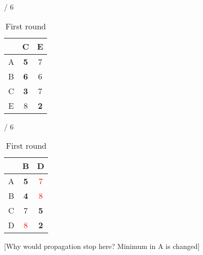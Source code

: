 \documentclass[a4paper, 11 pt, article, accentcolor=tud7b]{tudreport}
\begin{document}
\begin{table}[h]
\begin{subtable}[b]{\textwidth / 6}
\begin{tabular}{| c | c | c |}
	    \hline
	      & C                  & E                  \\ \hline
	    A & \textbf{5}         & 7                  \\ \hline
	    B & \textbf{6}         & 6                  \\ \hline
	    C & \textbf{3}         & 7                  \\ \hline
	    E & 8                  & \textbf{2}         \\ \hline
	    \end{tabular}
	    \caption{$D^{D}$}
	  \end{subtable}
	  \hfill
	  \begin{subtable}[b]{\textwidth / 6}
	    \begin{tabular}{| c | c | c |}
	    \hline
	      & B                   & D                    \\ \hline
	    A & \textbf{5}          & \textcolor{red}{7}   \\ \hline
	    B & \textbf{4}          & \textcolor{red}{8}   \\ \hline
	    C & 7                   & \textbf{5}           \\ \hline
	    D & \textcolor{red}{8}  & \textbf{2}           \\ \hline
	    \end{tabular}
	    \caption{$D^{E}$}
	  \end{subtable}
	  \caption{First round}
	\end{table}
	
	[Why would propagation stop here? Minimum in A is changed]
	
\end{document}
